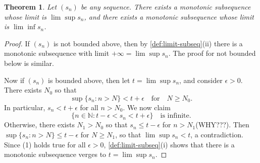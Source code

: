 \documentclass[12pt, lettersize]{book}
\theoremstyle{plain}
\newtheorem{thm}{Theorem}[section]
\theoremstyle{definition}
\theoremstyle{remark}
\begin{document}
		\setcounter{equation}{0}
		\begin{thm}\label{thm:subsequence with limit limsup or liminf}
		Let $(s_n)$ be any sequence. There exists a monotonic subsequence whose limit is $\lim\sup s_n$, and there exists a monotonic subsequence whose limit is $\lim\inf s_n$.
		\end{thm}
		\begin{proof}
			If $(s_n)$ is not bounded above, then by \ref{def:limit-subseq}(ii) there is a monotonic subsequence with limit $+\infty=\lim\sup s_n$. The proof for not bounded below is similar.
			
			Now if $(s_n)$ is bounded above, then let $t=\lim\sup s_n$, and consider $\epsilon>0$. There exists $N_0$ so that
			\begin{displaymath}
				\sup\{s_n: n>N\}<t+\epsilon\quad\text{for}\quad N\geq N_0.
			\end{displaymath}
			In particular, $s_n<t+\epsilon$ for all $n>N_0$. We now claim
			\begin{equation}
				\{n\in\mathbb{N}: t-\epsilon<s_n<t+\epsilon\}\quad\text{is infinite.}
			\end{equation}
			Otherwise, there exists $N_1>N_0$ so that $s_n\leq t-\epsilon$ for $n>N_1$(WHY???). Then $\sup\{s_n: n>N\}\leq t-\epsilon$ for $N\geq N_1$, so that $\lim\sup s_n<t$, a contradiction. Since (1) holds true for all $\epsilon>0$, \ref{def:limit-subseq}(i) shows that there is a monotonic subsequence verges to $t=\lim\sup s_n$.
		\end{proof}
		
\end{document}

